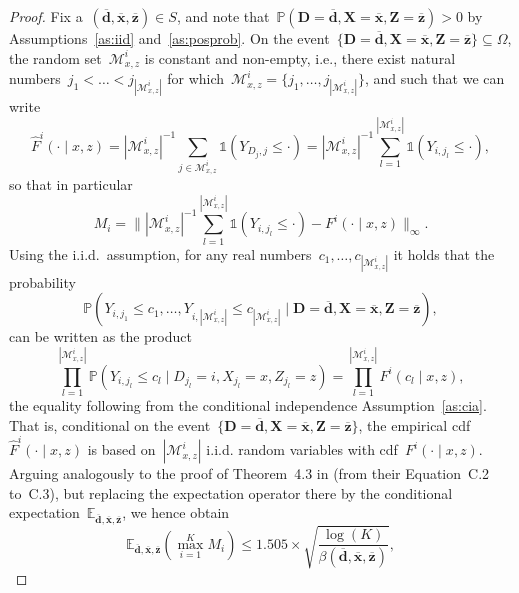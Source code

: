 \documentclass[11pt, a4paper]{article}
\theoremstyle{definition}
\begin{document}
\begin{proof}
Fix a~$(\overline{\bm{d}}, \overline{\bm{x}}, \overline{\bm{z}}) \in S$, and note that~$\mathbb{P}(\bm D = \overline{\bm{d}}, \bm{X} = \overline{\bm{x}}, \bm{Z} = \overline{\bm{z}}) > 0$ by Assumptions~\ref{as:iid} and~\ref{as:posprob}. On the event~$\{\bm D = \overline{\bm{d}}, \bm{X} = \overline{\bm{x}}, \bm{Z} = \overline{\bm{z}}\} \subseteq \Omega$, the random set~$\mathcal{M}_{x, z}^i$ is constant and non-empty, i.e., there exist natural numbers~$j_1 < \hdots < j_{|\mathcal{M}_{x, z}^i|}$ for which~$\mathcal{M}_{x, z}^i = \{j_1, \hdots, j_{|\mathcal{M}_{x, z}^i|}\}$, and such that we can write~$$\hat{F}^i(\cdot\mid x, z) = |\mathcal{M}_{x, z}^i|^{-1} \sum_{j \in \mathcal{M}_{x, z}^i} \mathds{1}( Y_{D_j,j} \leq \cdot ) = |\mathcal{M}_{x, z}^i|^{-1} \sum_{l = 1}^{|\mathcal{M}_{x, z}^i|} \mathds{1}(Y_{i,j_l} \leq \cdot),$$ so that in particular $$M_i = \| |\mathcal{M}_{x, z}^i|^{-1} \sum_{l = 1}^{|\mathcal{M}_{x, z}^i|} \mathds{1}(Y_{i,j_l} \leq \cdot) - F^i(\cdot \mid x, z)\|_{\infty}.$$ Using the i.i.d.~assumption, for any real numbers~$c_1, \hdots, c_{|\mathcal{M}_{x, z}^i|}$ it holds that the probability
%
\begin{equation*}
\mathbb{P}\left( Y_{i,j_1} \leq c_1, \hdots, Y_{i,|\mathcal{M}_{x, z}^i|} \leq c_{|\mathcal{M}_{x, z}^i|} \mid  \bm D = \overline{\bm{d}}, \bm{X} = \overline{\bm{x}}, \bm{Z} = \overline{\bm{z}} \right),
\end{equation*}
%
can be written as the product 
%
\begin{equation}\label{eqn:indrel}
\prod_{l = 1}^{|\mathcal{M}_{x, z}^i|}\mathbb{P}\left( Y_{i,j_l} \leq c_l \mid  D_{j_l} = i, X_{j_l} = x, Z_{j_l} = z \right) = \prod_{l = 1}^{|\mathcal{M}_{x, z}^i|} F^i( c_l \mid x, z),
\end{equation}
%
the equality following from the conditional independence Assumption~\ref{as:cia}. That is, conditional on the event~$\{\bm D = \overline{\bm{d}}, \bm{X} = \overline{\bm{x}}, \bm{Z} = \overline{\bm{z}}\}$, the empirical cdf~$\hat{F}^i(\cdot\mid x, z)$ is based on~$|\mathcal{M}_{x, z}^i|$ i.i.d. random variables with cdf~$F^i(\cdot\mid x, z)$. Arguing analogously to the proof of Theorem~4.3 in \cite{kpv3} (from their Equation~C.2 to~C.3), but replacing the expectation operator there by the conditional expectation~$\mathbb{E}_{\overline{\bm{d}}, \overline{\bm{x}}, \overline{\bm{z}}}$, we hence obtain 
%
\begin{equation*}
\mathbb{E}_{\overline{\bm{d}}, \overline{\bm{x}}, \overline{\bm{z}}} \left(\max_{i = 1}^K M_i\right) \leq 1.505 \times \sqrt{\frac{\log(K)}{\beta(\overline{\bm{d}}, \overline{\bm{x}}, \overline{\bm{z}})}},

\end{equation*}
\end{proof}
\end{document}
